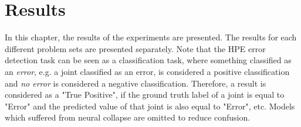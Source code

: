 \chapter{Results}
\label{sec:results}
In this chapter, the results of the experiments are presented. The results for each different problem sets are presented separately. Note that the HPE error detection task can be seen as a classification task, where something classified as an \textit{error}, e.g. a joint classified as an error, is considered a positive classification and \textit{no error} is considered a negative classification. Therefore, a result is considered as a "True Positive", if the ground truth label of a joint is equal to "Error" and the predicted value of that joint is also equal to "Error", etc. Models which suffered from neural collapse are omitted to reduce confusion.



